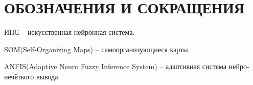 \section*{ОБОЗНАЧЕНИЯ И СОКРАЩЕНИЯ}

ИНС -- искусственная нейронная система.

SOM(Self-Organizing Maps) -- самоорганизующиеся карты.

ANFIS(Adaptive Neuro Fuzzy Inference System) -- адаптивная система нейро-нечёткого вывода.
